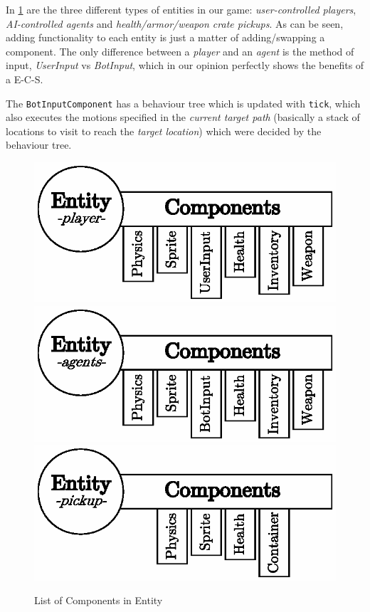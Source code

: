 \documentclass[a4paper, twocolumn]{article}
\begin{document}
        In \cref{fig:entity_component_system} are the three different types of entities in our game: \emph{user-controlled players}, \emph{AI-controlled agents} and \emph{health/armor/weapon crate pickups}. As can be seen, adding functionality to each entity is just a matter of adding/swapping a component. The only difference between a \emph{player} and an \emph{agent} is the method of input, \emph{UserInput} vs \emph{BotInput}, which in our opinion perfectly shows the benefits of a E-C-S.

        The \texttt{BotInputComponent} has a behaviour tree which is updated with \texttt{tick}, which also executes the motions specified in the \emph{current target path} (basically a stack of locations to visit to reach the \emph{target location}) which were decided by the behaviour tree.

        \begin{figure}[H]
            \centering
            \includegraphics[width=0.8\linewidth]{share/player_entity.eps}
            \includegraphics[width=0.8\linewidth]{share/agent_entity.eps}
            \includegraphics[width=0.8\linewidth]{share/pickup_entity.eps}
            \caption{List of Components in Entity}
            \label{fig:entity_component_system}
        \end{figure}
\end{document}
